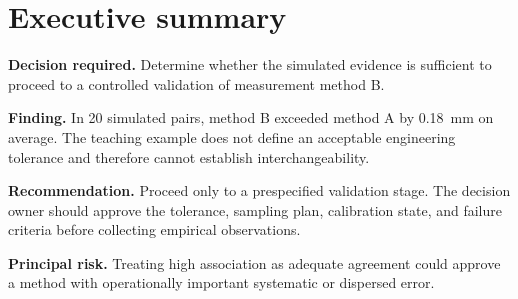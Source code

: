 \chapter*{Executive summary}

\textbf{Decision required.} Determine whether the simulated evidence is
sufficient to proceed to a controlled validation of measurement method B.

\textbf{Finding.} In 20 simulated pairs, method B exceeded method A by
\SI{0.18}{\milli\metre} on average. The teaching example does not define an
acceptable engineering tolerance and therefore cannot establish
interchangeability.

\textbf{Recommendation.} Proceed only to a prespecified validation stage. The
decision owner should approve the tolerance, sampling plan, calibration state,
and failure criteria before collecting empirical observations.

\textbf{Principal risk.} Treating high association as adequate agreement could
approve a method with operationally important systematic or dispersed error.
